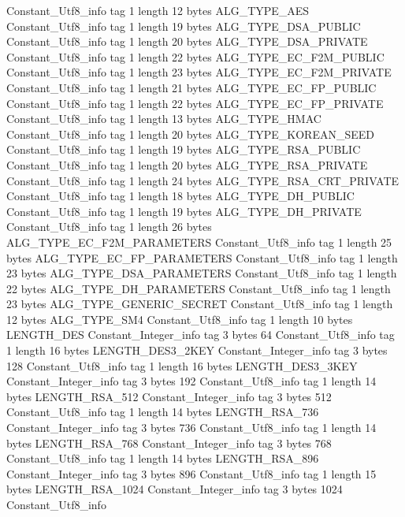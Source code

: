 {{{		}
		Constant_Utf8_info {
			tag	1
			length	12
			bytes	ALG_TYPE_AES
		}
		Constant_Utf8_info {
			tag	1
			length	19
			bytes	ALG_TYPE_DSA_PUBLIC
		}
		Constant_Utf8_info {
			tag	1
			length	20
			bytes	ALG_TYPE_DSA_PRIVATE
		}
		Constant_Utf8_info {
			tag	1
			length	22
			bytes	ALG_TYPE_EC_F2M_PUBLIC
		}
		Constant_Utf8_info {
			tag	1
			length	23
			bytes	ALG_TYPE_EC_F2M_PRIVATE
		}
		Constant_Utf8_info {
			tag	1
			length	21
			bytes	ALG_TYPE_EC_FP_PUBLIC
		}
		Constant_Utf8_info {
			tag	1
			length	22
			bytes	ALG_TYPE_EC_FP_PRIVATE
		}
		Constant_Utf8_info {
			tag	1
			length	13
			bytes	ALG_TYPE_HMAC
		}
		Constant_Utf8_info {
			tag	1
			length	20
			bytes	ALG_TYPE_KOREAN_SEED
		}
		Constant_Utf8_info {
			tag	1
			length	19
			bytes	ALG_TYPE_RSA_PUBLIC
		}
		Constant_Utf8_info {
			tag	1
			length	20
			bytes	ALG_TYPE_RSA_PRIVATE
		}
		Constant_Utf8_info {
			tag	1
			length	24
			bytes	ALG_TYPE_RSA_CRT_PRIVATE
		}
		Constant_Utf8_info {
			tag	1
			length	18
			bytes	ALG_TYPE_DH_PUBLIC
		}
		Constant_Utf8_info {
			tag	1
			length	19
			bytes	ALG_TYPE_DH_PRIVATE
		}
		Constant_Utf8_info {
			tag	1
			length	26
			bytes	ALG_TYPE_EC_F2M_PARAMETERS
		}
		Constant_Utf8_info {
			tag	1
			length	25
			bytes	ALG_TYPE_EC_FP_PARAMETERS
		}
		Constant_Utf8_info {
			tag	1
			length	23
			bytes	ALG_TYPE_DSA_PARAMETERS
		}
		Constant_Utf8_info {
			tag	1
			length	22
			bytes	ALG_TYPE_DH_PARAMETERS
		}
		Constant_Utf8_info {
			tag	1
			length	23
			bytes	ALG_TYPE_GENERIC_SECRET
		}
		Constant_Utf8_info {
			tag	1
			length	12
			bytes	ALG_TYPE_SM4
		}
		Constant_Utf8_info {
			tag	1
			length	10
			bytes	LENGTH_DES
		}
		Constant_Integer_info {
			tag	3
			bytes	64
		}
		Constant_Utf8_info {
			tag	1
			length	16
			bytes	LENGTH_DES3_2KEY
		}
		Constant_Integer_info {
			tag	3
			bytes	128
		}
		Constant_Utf8_info {
			tag	1
			length	16
			bytes	LENGTH_DES3_3KEY
		}
		Constant_Integer_info {
			tag	3
			bytes	192
		}
		Constant_Utf8_info {
			tag	1
			length	14
			bytes	LENGTH_RSA_512
		}
		Constant_Integer_info {
			tag	3
			bytes	512
		}
		Constant_Utf8_info {
			tag	1
			length	14
			bytes	LENGTH_RSA_736
		}
		Constant_Integer_info {
			tag	3
			bytes	736
		}
		Constant_Utf8_info {
			tag	1
			length	14
			bytes	LENGTH_RSA_768
		}
		Constant_Integer_info {
			tag	3
			bytes	768
		}
		Constant_Utf8_info {
			tag	1
			length	14
			bytes	LENGTH_RSA_896
		}
		Constant_Integer_info {
			tag	3
			bytes	896
		}
		Constant_Utf8_info {
			tag	1
			length	15
			bytes	LENGTH_RSA_1024
		}
		Constant_Integer_info {
			tag	3
			bytes	1024
		}
		Constant_Utf8_info {
}}}
